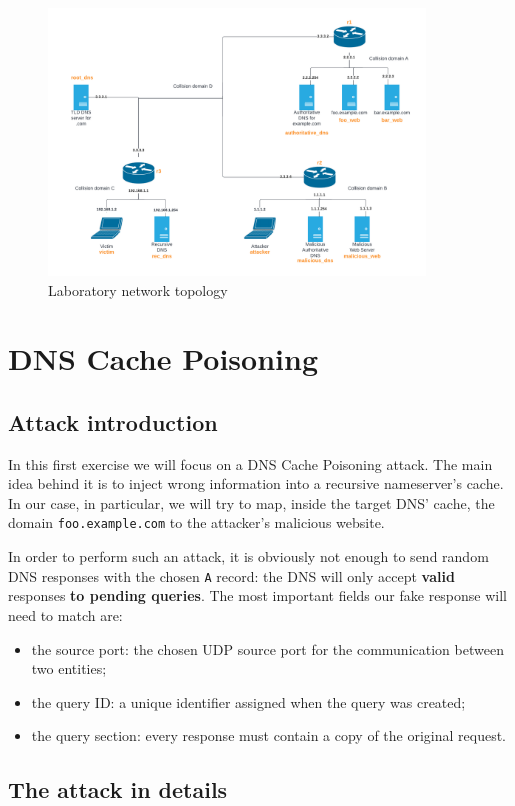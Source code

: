 \documentclass[11pt,a4paper]{article}
\begin{document}
\begin{figure}[h!]
  \centering
  \includegraphics[width=10cm]{network-topology.png}
  \caption{Laboratory network topology}
\end{figure}

\section{DNS Cache Poisoning}

\subsection{Attack introduction}
In this first exercise we will focus on a DNS Cache Poisoning attack. The main idea behind it is to inject wrong information into a recursive nameserver's cache. In our case, in particular, we will try to map, inside the target DNS' cache, the domain \texttt{foo.example.com} to the attacker's malicious website.

In order to perform such an attack, it is obviously not enough to send random DNS responses with the chosen \texttt{A} record: the DNS will only accept \textbf{valid} responses \textbf{to pending queries}. The most important fields our fake response will need to match are:
\begin{itemize}
    \item the source port: the chosen UDP source port for the communication between two entities;
    \item the query ID: a unique identifier assigned when the query was created;
    \item the query section: every response must contain a copy of the original request.
\end{itemize}

\subsection{The attack in details}
\label{subsec:attack-details}
\end{document}
